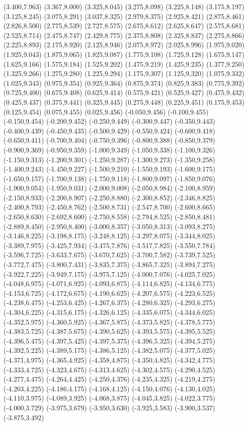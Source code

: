 (3.400,7.963) (3.367,8.000) (3.325,8.045) (3.275,8.098) (3.225,8.148) (3.175,8.197) (3.125,8.245) (3.075,8.291) (3.037,8.325) (2.979,8.375) (2.925,8.421) (2.875,8.461) (2.826,8.500) (2.775,8.539) (2.727,8.575) (2.675,8.612) (2.625,8.647) (2.575,8.681) (2.525,8.714) (2.475,8.747) (2.429,8.775) (2.375,8.808) (2.325,8.837) (2.275,8.866) (2.225,8.893) (2.175,8.920) (2.125,8.946) (2.075,8.972) (2.025,8.996) (1.975,9.020) (1.925,9.043) (1.875,9.065) (1.825,9.087) (1.775,9.108) (1.725,9.128) (1.675,9.147) (1.625,9.166) (1.575,9.184) (1.525,9.202) (1.475,9.219) (1.425,9.235) (1.377,9.250) (1.325,9.266) (1.275,9.280) (1.225,9.294) (1.175,9.307) (1.125,9.320) (1.075,9.332) (1.025,9.343) (0.975,9.354) (0.925,9.364) (0.875,9.374) (0.825,9.383) (0.775,9.392) (0.725,9.400) (0.675,9.408) (0.625,9.414) (0.575,9.421) (0.525,9.427) (0.475,9.432) (0.425,9.437) (0.375,9.441) (0.325,9.445) (0.275,9.448) (0.225,9.451) (0.175,9.453) (0.125,9.454) (0.075,9.455) (0.025,9.456) (-0.050,9.456) (-0.100,9.455) (-0.150,9.454) (-0.200,9.452) (-0.250,9.449) (-0.300,9.447) (-0.350,9.443) (-0.400,9.439) (-0.450,9.435) (-0.500,9.429) (-0.550,9.424) (-0.600,9.418) (-0.650,9.411) (-0.700,9.404) (-0.750,9.396) (-0.800,9.388) (-0.850,9.379) (-0.900,9.369) (-0.950,9.359) (-1.000,9.349) (-1.050,9.338) (-1.100,9.326) (-1.150,9.313) (-1.200,9.301) (-1.250,9.287) (-1.300,9.273) (-1.350,9.258) (-1.400,9.243) (-1.450,9.227) (-1.500,9.210) (-1.550,9.193) (-1.600,9.175) (-1.650,9.157) (-1.700,9.138) (-1.750,9.118) (-1.800,9.097) (-1.850,9.076) (-1.900,9.054) (-1.950,9.031) (-2.000,9.008) (-2.050,8.984) (-2.100,8.959) (-2.150,8.933) (-2.200,8.907) (-2.250,8.880) (-2.300,8.852) (-2.346,8.825) (-2.400,8.793) (-2.450,8.762) (-2.500,8.731) (-2.547,8.700) (-2.600,8.665) (-2.650,8.630) (-2.692,8.600) (-2.750,8.558) (-2.794,8.525) (-2.850,8.481) (-2.889,8.450) (-2.950,8.400) (-3.000,8.357) (-3.050,8.313) (-3.093,8.275) (-3.146,8.225) (-3.198,8.175) (-3.248,8.125) (-3.297,8.075) (-3.344,8.025) (-3.389,7.975) (-3.425,7.934) (-3.475,7.876) (-3.517,7.825) (-3.550,7.784) (-3.596,7.725) (-3.633,7.675) (-3.670,7.625) (-3.700,7.582) (-3.739,7.525) (-3.772,7.475) (-3.800,7.431) (-3.835,7.375) (-3.865,7.325) (-3.894,7.275) (-3.922,7.225) (-3.949,7.175) (-3.975,7.125) (-4.000,7.076) (-4.025,7.025) (-4.048,6.975) (-4.071,6.925) (-4.093,6.875) (-4.114,6.825) (-4.134,6.775) (-4.153,6.725) (-4.172,6.675) (-4.190,6.625) (-4.207,6.575) (-4.223,6.525) (-4.238,6.475) (-4.253,6.425) (-4.267,6.375) (-4.280,6.325) (-4.293,6.275) (-4.304,6.225) (-4.315,6.175) (-4.326,6.125) (-4.335,6.075) (-4.344,6.025) (-4.352,5.975) (-4.360,5.925) (-4.367,5.875) (-4.373,5.825) (-4.378,5.775) (-4.383,5.725) (-4.387,5.675) (-4.390,5.625) (-4.393,5.575) (-4.395,5.525) (-4.396,5.475) (-4.397,5.425) (-4.397,5.375) (-4.396,5.325) (-4.394,5.275) (-4.392,5.225) (-4.389,5.175) (-4.386,5.125) (-4.382,5.075) (-4.377,5.025) (-4.371,4.975) (-4.365,4.925) (-4.358,4.875) (-4.350,4.825) (-4.342,4.775) (-4.333,4.725) (-4.323,4.675) (-4.313,4.625) (-4.302,4.575) (-4.290,4.525) (-4.277,4.475) (-4.264,4.425) (-4.250,4.376) (-4.235,4.325) (-4.219,4.275) (-4.203,4.225) (-4.186,4.175) (-4.168,4.125) (-4.150,4.076) (-4.130,4.025) (-4.110,3.975) (-4.089,3.925) (-4.068,3.875) (-4.045,3.825) (-4.022,3.775) (-4.000,3.729) (-3.975,3.679) (-3.950,3.630) (-3.925,3.583) (-3.900,3.537) (-3.875,3.492) 